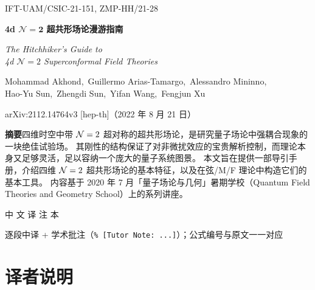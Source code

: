 \begin{titlepage}
\centering
{\small\ttfamily IFT-UAM/CSIC-21-151, ZMP-HH/21-28\par}
\vspace*{1.6cm}

{\LARGE\bfseries 4d $\boldsymbol{\mathcal{N}=2}$ 超共形场论漫游指南\par}

\vspace{1.0cm}
{\large\itshape The Hitchhiker's Guide to\\[0.2em]
4d $\mathcal{N}=2$ Superconformal Field Theories\par}

\vspace{1.4cm}
{\large Mohammad Akhond,\ Guillermo Arias-Tamargo,\ Alessandro Mininno,\\[0.3em]
Hao-Yu Sun,\ Zhengdi Sun,\ Yifan Wang,\ Fengjun Xu\par}

\vspace{0.6cm}
{\normalsize arXiv:2112.14764v3 [hep-th]（2022 年 8 月 21 日）\par}

\vspace{1.2cm}
\begin{minipage}{0.86\linewidth}
\small
\noindent\textbf{摘要}\quad 四维时空中带 $\mathcal{N}=2$ 超对称的超共形场论，是研究量子场论中强耦合现象的一块绝佳试验场。
其刚性的结构保证了对非微扰效应的宝贵解析控制，而理论本身又足够灵活，足以容纳一个庞大的量子系统图景。
本文旨在提供一部导引手册，介绍四维 $\mathcal{N}=2$ 超共形场论的基本特征，以及在弦/M/F 理论中构造它们的基本工具。
内容基于 2020 年 7 月「量子场论与几何」暑期学校（Quantum Field Theories and Geometry School）上的系列讲座。
\end{minipage}

\vfill
{\normalsize 中 文 译 注 本\par}
\vspace{0.4cm}
{\small 逐段中译 + 学术批注（\texttt{\% [Tutor Note: ...]}）；公式编号与原文一一对应\par}
\vspace{1.0cm}
\end{titlepage}

\section*{译者说明}

